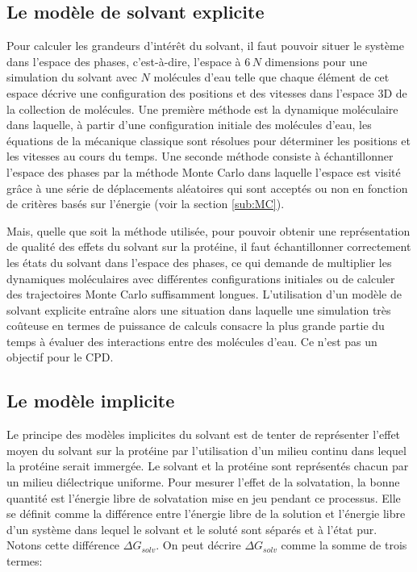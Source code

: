 \subsection{Le modèle de solvant explicite}

Pour calculer les grandeurs d'intérêt du solvant, il faut pouvoir situer le système dans l'espace des phases, c'est-à-dire, l'espace à $6\,N$ dimensions pour une simulation du solvant avec $N$ molécules d'eau telle que chaque élément de cet espace décrive une configuration des positions et des vitesses dans l'espace 3D de la collection de molécules.
Une première méthode est la dynamique moléculaire dans laquelle, à partir d'une configuration initiale des molécules d'eau, les équations de la mécanique classique sont résolues pour déterminer les positions et les vitesses au cours du temps. Une seconde méthode consiste à échantillonner l'espace des phases par la méthode Monte Carlo dans laquelle l'espace est visité grâce à une série de déplacements aléatoires qui sont acceptés ou non en fonction de critères basés sur l'énergie (voir la section \ref{sub:MC}).

Mais, quelle que soit la méthode utilisée, pour pouvoir obtenir une représentation de qualité des effets du solvant sur la protéine, il faut échantillonner correctement les états du solvant dans l'espace des phases, ce qui demande de multiplier les dynamiques moléculaires avec différentes configurations initiales ou de calculer des trajectoires Monte Carlo suffisamment longues.
L'utilisation d'un modèle de solvant explicite entraîne alors une situation dans laquelle une simulation très coûteuse en termes de puissance de calculs consacre la plus grande partie du temps à évaluer des interactions entre des molécules d'eau. Ce n'est pas un objectif pour le CPD.

\subsection{Le modèle implicite}

Le principe des modèles implicites du solvant est de tenter de représenter l'effet moyen du solvant sur la protéine par l'utilisation d'un milieu continu dans lequel la protéine serait immergée. Le solvant et la protéine sont représentés chacun par un milieu diélectrique uniforme.
Pour mesurer l'effet de la solvatation, la bonne quantité est l'énergie libre de solvatation mise en jeu pendant ce processus. Elle se définit comme la différence entre l'énergie libre de la solution et l'énergie libre d'un système dans lequel le solvant et le soluté sont séparés et à l'état pur. Notons cette différence $\Delta G_{solv}$. On peut décrire $\Delta G_{solv}$ comme la somme de trois termes:

